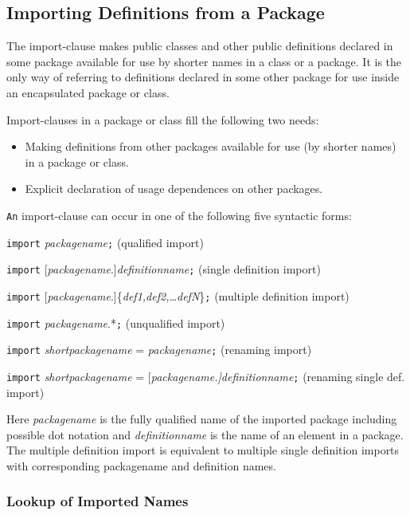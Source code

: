 \subsection{Importing Definitions from a Package}

The import-clause makes public classes and other public definitions
declared in some package available for use by shorter names in a class
or a package. It is the only way of referring to definitions declared in
some other package for use inside an encapsulated package or class.

\begin{nonnormative}
Import-clauses in a package or class fill the following two needs:
\begin{itemize}
\item
  Making definitions from other packages available for use (by shorter
  names) in a package or class.
\item
  Explicit declaration of usage dependences on other packages.
\end{itemize}
\end{nonnormative}

\lstinline!An! import-clause can occur in one of the following five syntactic forms:

\lstinline!import! \emph{packagename}\lstinline!;! (qualified import)

\lstinline!import! {[}\emph{packagename}.{]}\emph{definitionname}\lstinline!;! (single
definition import)

\lstinline!import!
{[}\emph{packagename}.{]}\{\emph{def1,def2,\ldots{}defN}\}\lstinline!;! (multiple
definition import)

\lstinline!import! \emph{packagename}.*\lstinline!;! (unqualified import)

\lstinline!import! \emph{shortpackagename} = \emph{packagename}\lstinline!;! (renaming
import)

\lstinline!import! \emph{shortpackagename} =
{[}\emph{packagename.{]}definitionname}\lstinline!;! (renaming single def. import)

Here \emph{packagename} is the fully qualified name of the imported
package including possible dot notation and \emph{definitionname} is the
name of an element in a package. The multiple definition import is
equivalent to multiple single definition imports with corresponding
packagename and definition names.

\subsubsection{Lookup of Imported Names}

